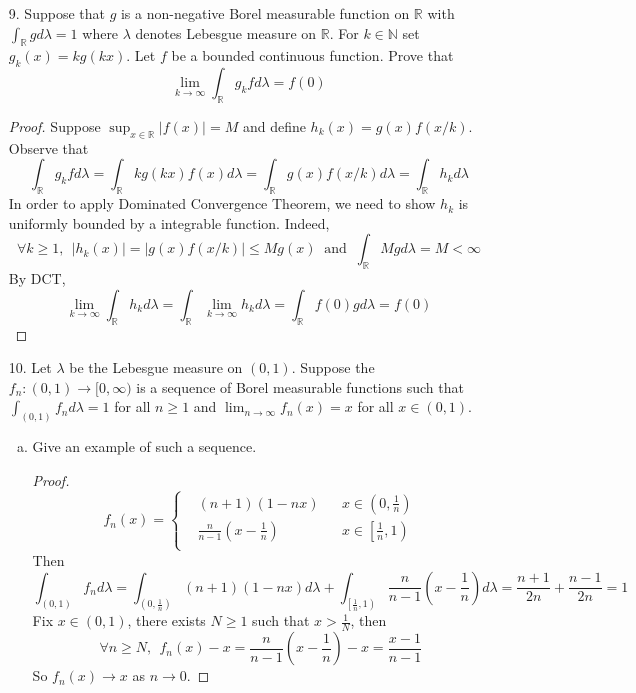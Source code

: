 \begin{itemize}
	\item[9.] Suppose that $g$ is a non-negative Borel measurable function on $\mathbb{R}$ with $\int_{\mathbb{R}} gd\lambda = 1$
	where $\lambda$ denotes Lebesgue measure on $\mathbb{R}$. For $k\in \mathbb{N}$ set $g_k(x) = kg(kx)$. Let $f$ be a
	bounded continuous function. Prove that
	$$
	\lim_{k\rightarrow \infty } \int_{\mathbb{R}} g_kfd\lambda = f(0)
	$$
	\begin{proof}
		Suppose $\sup_{x\in \mathbb{R}}|f(x)| = M$ and define $h_k(x) = g(x)f(x/k)$. Observe that 
		$$
		\int_{\mathbb{R}} g_k fd\lambda = \int_{\mathbb{R}} kg(kx)f(x)d\lambda = \int_{\mathbb{R}} g(x)f(x/k)d\lambda = \int_{\mathbb{R}} h_k d\lambda
		$$
		In order to apply Dominated Convergence Theorem, we need to show $h_k$ is uniformly bounded by a integrable function. Indeed, 
		$$
		\forall k\ge 1,~~|h_k(x)| = |g(x)f(x/k)|\le Mg(x) ~\text{  and  }~ \int_{\mathbb{R}} Mgd\lambda = M < \infty 
		$$
		By DCT,
		$$
		\lim_{k\rightarrow \infty} \int_{\mathbb{R}} h_kd\lambda = \int_{\mathbb{R}} \lim_{k\rightarrow \infty } h_k d\lambda = \int_{\mathbb{R}} f(0)gd\lambda = f(0)
		$$
	\end{proof}
	\item[10.]  Let $\lambda$ be the Lebesgue measure on $(0, 1)$. Suppose the $f_n : (0, 1) \rightarrow [0, \infty)$ is
	a sequence of Borel measurable functions such that $\int_{(0,1)}f_nd\lambda=1$ for all $n \ge 1$ and
	$\lim_{n\rightarrow \infty}f_n(x) = x$ for all $x\in (0, 1)$.
	\begin{enumerate}[(a)]
		\item Give an example of such a sequence.
		\begin{proof}
			$$
			f_n(x)  = \left\{
			\begin{aligned}
			&(n+1)\left( 1 - nx\right)& &x\in \left(0, \frac{1}{n}\right)\\
			&\frac{n}{n-1}\left( x-\frac{1}{n}\right)& &x\in \left[\frac{1}{n}, 1\right)\\
			\end{aligned}\right.
			$$
			Then
			$$
			\int_{(0,1)} f_n d\lambda= \int_{ \left(0, \frac{1}{n}\right)}(n+1)\left( 1 - nx\right)d\lambda + \int_{\left[\frac{1}{n}, 1\right)}\frac{n}{n-1}\left( x-\frac{1}{n}\right) d\lambda = \frac{n+1}{2n} + \frac{n-1}{2n} = 1
			$$
			Fix $x\in (0,1)$, there exists $N\ge 1$ such that $x > \frac{1}{N}$, then
			$$
			\forall n\ge N, ~~f_n(x) -x= \frac{n}{n-1}\left( x-\frac{1}{n}\right)- x= \frac{x-1}{n-1}
			$$
			So $f_n(x) \rightarrow x$ as $n\rightarrow 0$.
		\end{proof}

\end{enumerate}
\end{itemize}
